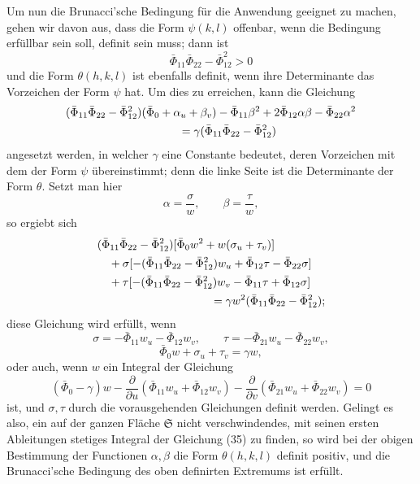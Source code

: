 \documentclass[11pt,a4paper,leqno]{article}
\begin{document}
Um nun die Brunacci'sche Bedingung für die Anwendung geeignet zu machen,
gehen wir davon aus, dass die Form $\psi(k,l)$ offenbar, wenn die Bedingung
erfüllbar sein soll, definit sein muss; dann ist
\[
\bar\Phi_{11}\bar\Phi_{22}-\bar\Phi_{12}^{2}>0
\]
und die Form $\theta(h,k,l)$ ist ebenfalls definit, wenn ihre Determinante
das Vorzeichen der Form $\psi$ hat. Um dies zu erreichen, kann die Gleichung
\[
\begin{aligned}
&(\bar\Phi_{11}\bar\Phi_{22}-\bar\Phi_{12}^{2})
(\bar\Phi_0+\alpha_u+\beta_v)-\bar\Phi_{11}\beta^2
+2\bar\Phi_{12}\alpha\beta-\bar\Phi_{22}\alpha^2\\
&\hspace{35mm}=\gamma
(\bar\Phi_{11}\bar\Phi_{22}-\bar\Phi_{12}^{2})
\end{aligned}
\]
angesetzt werden, in welcher $\gamma$ eine Constante bedeutet, deren
Vorzeichen mit dem der Form $\psi$ übereinstimmt; denn die linke Seite ist
die Determinante der Form $\theta$. Setzt man hier
\[
\alpha=\frac{\sigma}{w},\qquad \beta=\frac{\tau}{w},
\]
so ergiebt sich
\[
\begin{aligned}
&(\bar\Phi_{11}\bar\Phi_{22}-\bar\Phi_{12}^{2})
[\bar\Phi_0w^2+w(\sigma_u+\tau_v)]\\
&\quad+\sigma[-(\bar\Phi_{11}\bar\Phi_{22}-\bar\Phi_{12}^{2})w_u
+\bar\Phi_{12}\tau-\bar\Phi_{22}\sigma]\\
&\quad+\tau[-(\bar\Phi_{11}\bar\Phi_{22}-\bar\Phi_{12}^{2})w_v
-\bar\Phi_{11}\tau+\bar\Phi_{12}\sigma]\\
&\hspace{35mm}=\gamma w^2
(\bar\Phi_{11}\bar\Phi_{22}-\bar\Phi_{12}^{2});
\end{aligned}
\]
diese Gleichung wird erfüllt, wenn
\[
\sigma=-\bar\Phi_{11}w_u-\bar\Phi_{12}w_v,\qquad
\tau=-\bar\Phi_{21}w_u-\bar\Phi_{22}w_v,
\]
\[
\bar\Phi_0w+\sigma_u+\tau_v=\gamma w,
\]
oder auch, wenn $w$ ein Integral der Gleichung
\begin{equation}\tag{35}
(\bar\Phi_0-\gamma)w
-\frac{\partial}{\partial u}(\bar\Phi_{11}w_u+\bar\Phi_{12}w_v)
-\frac{\partial}{\partial v}(\bar\Phi_{21}w_u+\bar\Phi_{22}w_v)=0
\end{equation}
ist, und $\sigma,\tau$ durch die vorausgehenden Gleichungen definit werden.
Gelingt es also, ein auf der ganzen Fläche $\mathfrak{S}$ nicht
verschwindendes, mit seinen ersten Ableitungen stetiges Integral der Gleichung
(35) zu finden, so wird bei der obigen Bestimmung der Functionen
$\alpha,\beta$ die Form $\theta(h,k,l)$ definit positiv, und die
Brunacci'sche Bedingung des oben definirten Extremums ist erfüllt.
\end{document}
